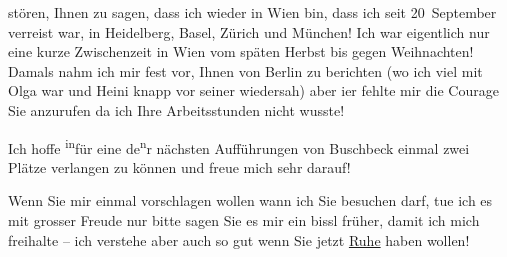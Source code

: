                stören, Ihnen zu sagen, dass ich wieder in Wien
               bin, dass ich seit 20 September verreist war, in Heidelberg, Basel, Zürich und München! Ich war eigentlich nur eine kurze Zwischenzeit in Wien vom späten Herbst bis gegen Weihnachten! Damals nahm ich
               mir fest vor, Ihnen von Berlin zu berichten (wo
               ich viel mit Olga war und Heini knapp vor seiner \label{K_L02542-2v}\label{K_L02542-2} wiedersah) aber i{\geminationm}er {\pb}fehlte
               mir die Courage Sie anzurufen da ich Ihre Arbeitsstunden nicht wusste!\pend
           
\pstart
           Ich hoffe \substVorne{}\textsuperscript{in}\substDazwischen{}für eine\substHinten{} de\substVorne{}\textsuperscript{n}\substDazwischen{}r\substHinten{} nächsten Aufführungen von Buschbeck
               einmal zwei Plätze verlangen zu können und freue mich sehr darauf!\pend
           
\pstart
           Wenn Sie mir einmal vorschlagen wollen wann ich Sie besuchen darf, tue ich es mit
               grosser Freude nur bitte sagen Sie es mir ein bissl früher, damit ich mich freihalte
               – ich verstehe aber auch so gut wenn Sie jetzt \uline{Ruhe}
               haben wollen!\pend
           
